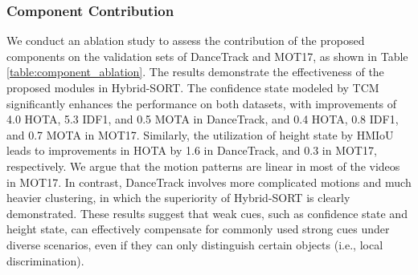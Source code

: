 \documentclass[letterpaper]{article} \usepackage{aaai23}  \usepackage{times}  \usepackage{helvet}  \usepackage{courier}  \usepackage[hyphens]{url}  \usepackage{graphicx} \urlstyle{rm} \def\UrlFont{\rm}  \usepackage{natbib}  \usepackage{caption} \frenchspacing  \setlength{\pdfpagewidth}{8.5in}  \setlength{\pdfpageheight}{11in}  \usepackage{algorithm}
\begin{document}
\subsubsection{Component Contribution}
We conduct an ablation study to assess the contribution of the proposed components on the validation sets of DanceTrack and MOT17, as shown in Table \ref{table:component_ablation}. The results demonstrate the effectiveness of the proposed modules in Hybrid-SORT. The confidence state modeled by TCM significantly enhances the performance on both datasets, with improvements of 4.0 HOTA, 5.3 IDF1, and 0.5 MOTA in DanceTrack, and 0.4 HOTA, 0.8 IDF1, and 0.7 MOTA in MOT17. Similarly, the utilization of height state by HMIoU leads to improvements in HOTA by 1.6 in DanceTrack, and 0.3 in MOT17, respectively. We argue that the motion patterns are linear in most of the videos in MOT17. In contrast, DanceTrack involves more complicated motions and much heavier clustering, in which the superiority of Hybrid-SORT is clearly demonstrated. These results suggest that weak cues, such as confidence state and height state, can effectively compensate for commonly used strong cues under diverse scenarios, even if they can only distinguish certain objects (i.e., local discrimination).





\begin{table*}
\begin{center}
\caption{Components ablation on MOT17-val and DanceTrack-val.}
\label{table:component_ablation}
\end{center}
\end{table*}
\end{document}
